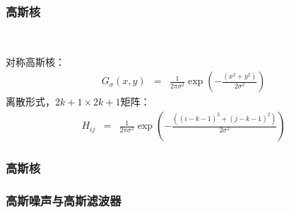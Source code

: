 \documentclass{beamer}
\newcommand{\nospace}{}
\newcommand{\tmfoldedstd}[2]{\trivlist{\item[$\bullet$]\mbox{}#1}}
\begin{document}
{{\begin{frame}
  \tmfoldedstd{Figure 8.1.}{Although a uniform local average may seem to give
  a good blurring model, it generates effects that are not usually seen in
  defocussing a lens. The images above compare the effects of a uniform local
  average with weighted average. The image at the top shows a view of grass.
  On the left in the second row, the result of blurring this image using a
  uniform local model and on the right, the result of blurring this image
  using a set of Gaussian weights. The degree of blurring in each case is
  about the same, but the uniform average produces a set of narrow vertical
  and horizontal bars --- an effect often known as ringing. The bottom row
  shows the weights used to blur the image, themselves rendered as an image;
  bright points represent large values and dark points represent small values
  (in this example the smallest values are zero).}
\end{frame}}{\begin{frame}
  \frametitle{高斯核}
  
  \
  
  对称高斯核：
  \begin{eqnarray*}
    G_{\sigma} (x, y) & = & \frac{1}{2 \pi \sigma^2} \exp \left( - \frac{(x^2
    + y^2)}{2 \sigma^2} \right)
  \end{eqnarray*}
  离散形式，$2 k + 1 \times 2 k + 1$矩阵：
  \begin{eqnarray*}
    H_{i \nospace j} & = & \frac{1}{2 \pi \sigma^2} \exp \left( - \frac{((i -
    k - 1)^2 + (j - k - 1)^2)}{2 \sigma^2} \right)
  \end{eqnarray*}
\end{frame}}{\begin{frame}
  \frametitle{高斯核}
  
  {\hspace{4em}}
\end{frame}}{\begin{frame}
  \frametitle{高斯噪声与高斯滤波器}
  

\end{frame}}}
\end{document}
